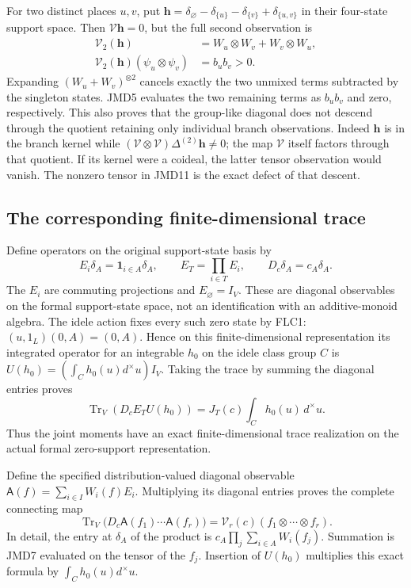 \documentclass[11pt]{article}
\begin{document}
For two distinct places $u,v$, put
$\mathbf h=\delta_\varnothing-\delta_{\{u\}}-
\delta_{\{v\}}+\delta_{\{u,v\}}$ in their four-state support space.
Then $\mathcal V\mathbf h=0$, but the full second observation is
\[
\boxed{
\begin{aligned}
\mathcal V_2(\mathbf h)&=W_u\otimes W_v+W_v\otimes W_u,\\
\mathcal V_2(\mathbf h)(\psi_u\otimes\psi_v)&=b_ub_v>0.
\end{aligned}}
\tag{JMD11}
\]
Expanding $(W_u+W_v)^{\otimes2}$ cancels exactly the two unmixed
terms subtracted by the singleton states. JMD5 evaluates the two
remaining terms as $b_ub_v$ and zero, respectively.
This also proves that the group-like diagonal does not descend
through the quotient retaining only individual branch observations.
Indeed $\mathbf h$ is in the branch kernel while
$(\mathcal V\otimes\mathcal V)\Delta^{(2)}\mathbf h\ne0$;
the map $\mathcal V$ itself factors through that quotient.
If its kernel were a coideal, the latter tensor observation would
vanish. The nonzero tensor in JMD11 is the exact defect of that descent.

\subsection{The corresponding finite-dimensional trace}

Define operators on the original support-state basis by
\[
E_i\delta_A=\mathbf1_{i\in A}\delta_A,\qquad
E_T=\prod_{i\in T}E_i,\qquad
D_c\delta_A=c_A\delta_A.
\tag{JMD12}
\]
The $E_i$ are commuting projections and $E_\varnothing=I_V$.
These are diagonal observables on the formal support-state space,
not an identification with an additive-monoid algebra.
The idele action fixes every such zero state by FLC1:
$(u,1_L)(0,A)=(0,A)$.
Hence on this finite-dimensional representation its integrated
operator for an integrable $h_0$ on the idele class group $C$ is
$U(h_0)=(\int_Ch_0(u)d^\times u)I_V$.
Taking the trace by summing the diagonal entries proves
\[
\boxed{
\operatorname{Tr}_V(D_cE_TU(h_0))
=J_T(c)\int_C h_0(u)\,d^\times u.}
\tag{JMD13}
\]
Thus the joint moments have an exact finite-dimensional trace
realization on the actual formal zero-support representation.

Define the specified distribution-valued diagonal observable
$\mathsf A(f)=\sum_{i\in I}W_i(f)E_i$.
Multiplying its diagonal entries proves the complete connecting map
\[
\boxed{
\operatorname{Tr}_V\bigl(D_c\mathsf A(f_1)\cdots\mathsf A(f_r)\bigr)
=\mathcal V_r(c)(f_1\otimes\cdots\otimes f_r).}
\tag{JMD14}
\]
In detail, the entry at $\delta_A$ of the product is
$c_A\prod_j\sum_{i\in A}W_i(f_j)$.
Summation is JMD7 evaluated on the tensor of the $f_j$.
Insertion of $U(h_0)$ multiplies this exact formula by
$\int_Ch_0(u)d^\times u$.
\end{document}
